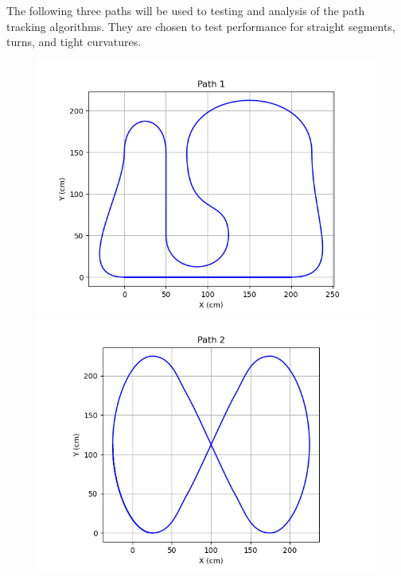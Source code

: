 \documentclass[mla8alt]{mla}
\begin{document}
\begin{paper}
The following three paths will be used to testing and analysis of the path tracking algorithms. They are chosen to test performance for straight segments, turns, and tight curvatures.

\begin{figure}[H]
\includegraphics[width=\linewidth]{pathData/path1}
\label{img:path1}
\endminipage\hfill
{}
\includegraphics[width=\linewidth]{pathData/path2}
\label{img:path2}
\endminipage\\

\end{figure}
\end{paper}
\end{document}
